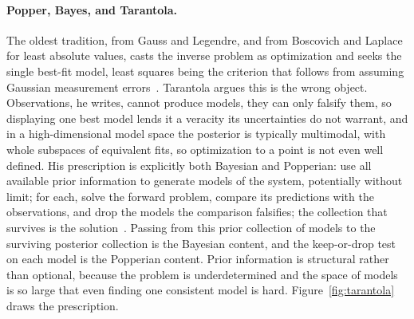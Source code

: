\documentclass[11pt]{article}
\begin{document}
\paragraph{Popper, Bayes, and Tarantola.} The oldest tradition, from Gauss and Legendre, and from
Boscovich and Laplace for least absolute values, casts the
inverse problem as optimization and seeks the single best-fit model, least squares being the criterion
that follows from assuming Gaussian measurement errors~\cite{tarantola_np}. Tarantola argues this is the
wrong object. Observations, he writes, cannot produce models, they can only falsify them, so displaying
one best model lends it a veracity its uncertainties do not warrant, and in a high-dimensional model
space the posterior is typically multimodal, with whole subspaces of equivalent fits, so optimization to
a point is not even well defined. His prescription is explicitly both Bayesian and Popperian: use all
available prior information to generate models of the system, potentially without limit; for each, solve
the forward problem, compare its predictions with the observations, and drop the models the comparison
falsifies; the collection that survives is the solution~\cite{tarantola_np,tarantola_book}. Passing from
this prior collection of models to the surviving posterior collection is the Bayesian content, and the
keep-or-drop test on each model is the Popperian content. Prior information is structural rather than
optional, because the problem is underdetermined and the space of models is so large
that even finding one consistent model is hard. Figure~\ref{fig:tarantola} draws the prescription.
\end{document}
